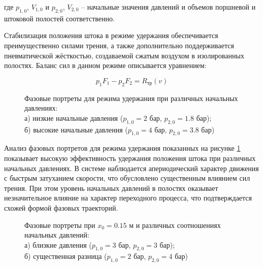 где $p_{1,0}$, $V_{1,0}$ и $p_{2,0}$, $V_{2,0}$ -- начальные значения давлений и объемов поршневой и штоковой полостей соответственно.

Стабилизация положения штока в режиме удержания обеспечивается преимущественно силами трения, а также дополнительно
поддерживается пневматической жёсткостью, создаваемой сжатым воздухом в изолированных полостях. Баланс сил в данном режиме описывается уравнением:

\begin{equation*}
	p_1F_1 - p_2F_2 = R_\text{тр}(v)
\end{equation*}

\begin{figure}[htbp]
	\caption{Фазовые портреты для режима удержания при различных начальных давлениях:\\
		а) низкие начальные давления ($p_{1,0} = 2$ бар, $p_{2,0} = \num{1.8}$ бар);\\
		б) высокие начальные давления ($p_{1,0} = 4$ бар, $p_{2,0} = \num{3.8}$ бар)}
	\label{fig:pp_hold_mode}
\end{figure}

Анализ фазовых портретов для режима удержания показанных на рисунке \ref{fig:pp_hold_mode} показывает высокую эффективность удержания положения штока при различных начальных давлениях.
В системе наблюдается апериодический характер движения с быстрым затуханием скорости, что обусловлено существенным влиянием сил трения.
При этом уровень начальных давлений в полостях оказывает незначительное влияние на характер переходного процесса, что подтверждается схожей формой фазовых траекторий.

\begin{figure}[htbp]
	\caption{Фазовые портреты при $x_0 = \num{0.15}$ м и различных соотношениях начальных давлений:\\
		а) близкие давления ($p_{1,0} = 3$ бар, $p_{2,0} = 3$ бар);\\
		б) существенная разница ($p_{1,0} = 2$ бар, $p_{2,0} = 4$ бар)}
	\label{fig:pp_hold_matrix}
\end{figure}

